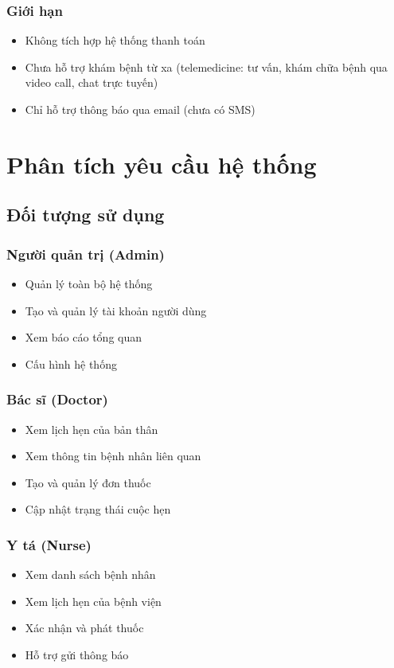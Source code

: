 \documentclass[12pt,a4paper]{report}
\begin{document}
\subsection{Giới hạn}
\begin{itemize}
    \item Không tích hợp hệ thống thanh toán
    \item Chưa hỗ trợ khám bệnh từ xa (telemedicine: tư vấn, khám chữa bệnh qua video call, chat trực tuyến)
    \item Chỉ hỗ trợ thông báo qua email (chưa có SMS)
\end{itemize}

\chapter{Phân tích yêu cầu hệ thống}

\section{Đối tượng sử dụng}
\subsection{Người quản trị (Admin)}
\begin{itemize}
    \item Quản lý toàn bộ hệ thống
    \item Tạo và quản lý tài khoản người dùng
    \item Xem báo cáo tổng quan
    \item Cấu hình hệ thống
\end{itemize}

\subsection{Bác sĩ (Doctor)}
\begin{itemize}
    \item Xem lịch hẹn của bản thân
    \item Xem thông tin bệnh nhân liên quan
    \item Tạo và quản lý đơn thuốc
    \item Cập nhật trạng thái cuộc hẹn
\end{itemize}

\subsection{Y tá (Nurse)}
\begin{itemize}
    \item Xem danh sách bệnh nhân
    \item Xem lịch hẹn của bệnh viện
    \item Xác nhận và phát thuốc
    \item Hỗ trợ gửi thông báo
\end{itemize}
\end{document}
